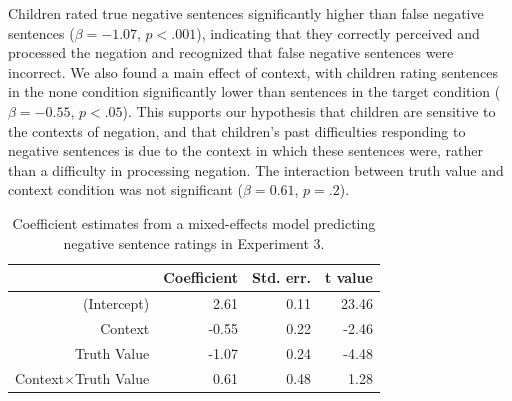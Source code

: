 \documentclass[man, noapacite]{apa2}
\begin{document}
Children rated true negative sentences significantly higher than false negative sentences ($\beta= -1.07$, $p< .001$), indicating that they correctly perceived and processed the negation and recognized that false negative sentences were incorrect. We also found a main effect of context, with children rating sentences in the none condition significantly lower than sentences in the target condition ($\beta= -0.55$, $p< .05$). This supports our hypothesis that children are sensitive to the contexts of negation, and that children's past difficulties responding to negative sentences is due to the context in which these sentences were, rather than a difficulty in processing negation. The interaction between truth value and context condition was not significant ($\beta= 0.61$, $p=.2$).

\begin{table}[t]
\caption{\label{tab:s3.1} Coefficient estimates from a mixed-effects model predicting negative sentence ratings in Experiment 3.}
\begin{center}
\small\addtolength{\tabcolsep}{-5pt}
\begin{tabular}{rrrr}
 \hline
 & Coefficient & Std. err. & t value \\
 \hline
(Intercept) & 2.61 & 0.11 & 23.46 \\
 Context & -0.55 & 0.22 & -2.46 \\
 Truth Value & -1.07 & 0.24 & -4.48 \\
 Context$\times$Truth Value & 0.61 & 0.48 & 1.28 \\
  \hline
\end{tabular}
\end{center}
\end{table}

\end{document}
